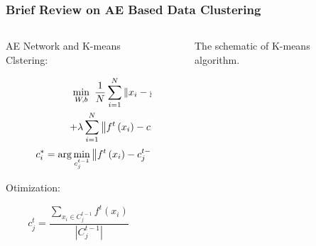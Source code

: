 \documentclass[10pt]{beamer}
\begin{document}
\begin{frame}
\frametitle{Brief Review on AE Based Data Clustering}
\begin{columns}
\begin{column}{0.6\textwidth}

AE Network and K-means Clstering:

\begin{equation} 
\begin{split}
\min \limits_{W,b}~\frac {1}{N}\sum \limits _{i = 1}^{N}{{{\left \|{ {x_{i} - {y_{i}}} }\right \|}^{2}}} \\ + \lambda \sum \limits _{i = 1}^{N} {\left \|{ {f^{t}\left ({ {x_{i}} }\right ) - c_{i}^{*}} }\right \|_{F}^{2}} \\
\quad 
\hphantom {\min \limits _{W,b}~}c_{i}^{*} = \arg \min \limits _{c_{j}^{t - 1}} \left \|{ {f^{t}\left ({ {x_{i}} }\right ) - c_{j}^{t - 1}} }\right \|_{F}^{2}
\end{split}
\end{equation}

Otimization:

\begin{equation} \label{eq:three}
c_{j}^{t} = \frac {{\sum \nolimits _{x_{i} \in C_{j}^{t - 1}} {f^{t}\left ({ {x_{i}} }\right )} }}{{\left |{ {C_{j}^{t - 1}} }\right |}}
\end{equation} 
\end{column}
\begin{column}{0.5\textwidth}

\begin{figure}
\centering
{}
\caption{The schematic of K-means algorithm.}
\label{fig:two}
\end{figure}


\end{column}
\end{columns}
\end{frame}
\end{document}
